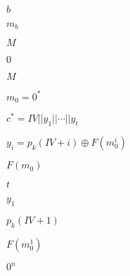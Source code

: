 \documentclass[10pt]{book}
\begin{document}
\begin{mdSnippets}
\begin{mdInlineSnippet}
$b$\end{mdInlineSnippet}%
\begin{mdInlineSnippet}[7960e7402c420dc1ba0324867807f1f6]%
$m_b$\end{mdInlineSnippet}%
\begin{mdInlineSnippet}[69691c7bdcc3ce6d5d8a1361f22d04ac]%
$M$\end{mdInlineSnippet}%
\begin{mdInlineSnippet}%
$0$\end{mdInlineSnippet}%
\begin{mdInlineSnippet}[69691c7bdcc3ce6d5d8a1361f22d04ac]%
$M$\end{mdInlineSnippet}%
\begin{mdInlineSnippet}[1e2870f5046089aaa15b68a399c064b5]%
$m_0 = 0^*$\end{mdInlineSnippet}%
\begin{mdInlineSnippet}%
$c^* = IV || y_1 || \cdots || y_t$\end{mdInlineSnippet}%
\begin{mdInlineSnippet}%
$y_i = p_k(IV + i) \oplus F(m^i_0)$\end{mdInlineSnippet}%
\begin{mdInlineSnippet}[0e0f76e31e47aba8b2a5a4d6af463a21]%
$F(m_0)$\end{mdInlineSnippet}%
\begin{mdInlineSnippet}[e358efa489f58062f10dd7316b65649e]%
$t$\end{mdInlineSnippet}%
\begin{mdInlineSnippet}[4764360e2689c701dfb8b917ba7638ac]%
$y_1$\end{mdInlineSnippet}%
\begin{mdInlineSnippet}[3cf96ce77c7dec510a1d4609bb2a14d0]%
$p_k(IV + 1)$\end{mdInlineSnippet}%
\begin{mdInlineSnippet}[b73fc30a4806f79d4385e3b21e5e5c94]%
$F(m^1_0)$\end{mdInlineSnippet}%
\begin{mdInlineSnippet}[fac114da054a45523468255b39e0d32b]%
$0^n$\end{mdInlineSnippet}%

\end{mdSnippets}
\end{document}
